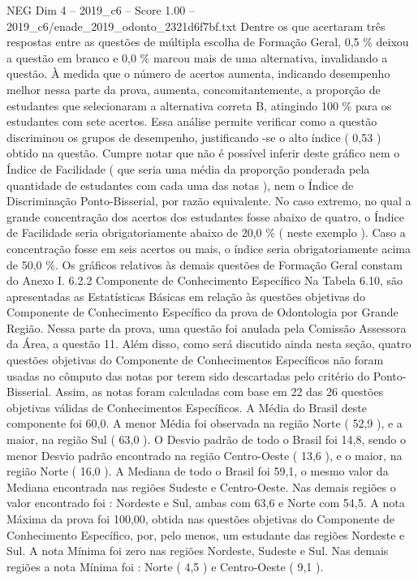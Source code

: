 \begin{textsample}{NEG Dim 4 – 2019\_c6 – Score 1.00 – 2019\_c6/enade\_2019\_odonto\_2321d6f7bf.txt}
Dentre os que acertaram três respostas entre as questões de múltipla escolha de Formação Geral, 0,5 \% deixou a questão em branco e 0,0 \% marcou mais de uma alternativa, invalidando a questão.
À medida que o número de acertos aumenta, indicando desempenho melhor nessa parte da prova, aumenta, concomitantemente, a proporção de estudantes que selecionaram a alternativa correta B, atingindo 100 \% para os estudantes com sete acertos.
Essa análise permite verificar como a questão discriminou os grupos de desempenho, justificando -se o alto índice ( 0,53 ) obtido na questão.
Cumpre notar que não é possível inferir deste gráfico nem o Índice de Facilidade ( que seria uma média da proporção ponderada pela quantidade de estudantes com cada uma das notas ), nem o Índice de Discriminação Ponto-Bisserial, por razão equivalente.
No caso extremo, no qual a grande concentração dos acertos dos estudantes fosse abaixo de quatro, o Índice de Facilidade seria obrigatoriamente abaixo de 20,0 \% ( neste exemplo ).
Caso a concentração fosse em seis acertos ou mais, o índice seria obrigatoriamente acima de 50,0 \%.
Os gráficos relativos às demais questões de Formação Geral constam do Anexo I. 6.2.2 Componente de Conhecimento Específico Na Tabela 6.10, são apresentadas as Estatísticas Básicas em relação às questões objetivas do Componente de Conhecimento Específico da prova de Odontologia por Grande Região.
Nessa parte da prova, uma questão foi anulada pela Comissão Assessora da Área, a questão 11.
Além disso, como será discutido ainda nesta seção, quatro questões objetivas do Componente de Conhecimentos Específicos não foram usadas no cômputo das notas por terem sido descartadas pelo critério do Ponto-Bisserial.
Assim, as notas foram calculadas com base em 22 das 26 questões objetivas válidas de Conhecimentos Específicos.
A Média do Brasil deste componente foi 60,0.
A menor Média foi observada na região Norte ( 52,9 ), e a maior, na região Sul ( 63,0 ).
O Desvio padrão de todo o Brasil foi 14,8, sendo o menor Desvio padrão encontrado na região Centro-Oeste ( 13,6 ), e o maior, na região Norte ( 16,0 ).
A Mediana de todo o Brasil foi 59,1, o mesmo valor da Mediana encontrada nas regiões Sudeste e Centro-Oeste.
Nas demais regiões o valor encontrado foi : Nordeste e Sul, ambas com 63,6 e Norte com 54,5.
A nota Máxima da prova foi 100,00, obtida nas questões objetivas do Componente de Conhecimento Específico, por, pelo menos, um estudante das regiões Nordeste e Sul.
A nota Mínima foi zero nas regiões Nordeste, Sudeste e Sul.
Nas demais regiões a nota Mínima foi : Norte ( 4,5 ) e Centro-Oeste ( 9,1 ).

\end{textsample}
